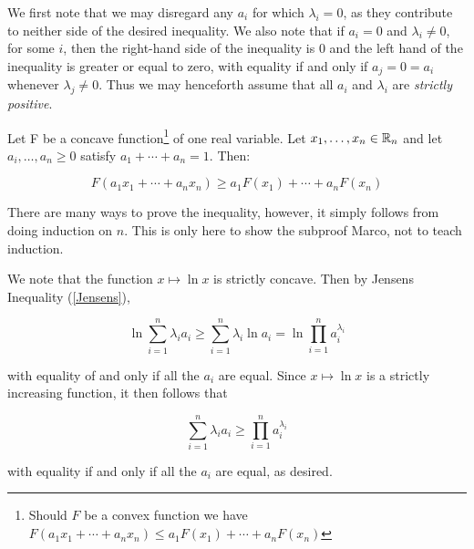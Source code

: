 \begin{solution}
	
	We first note that we may disregard any \(a_i\) for which \(\lambda_i=0\), as they contribute to neither side of the desired inequality. We also note that if \(a_i=0\) and \(\lambda_i\ne 0\), for some \(i\), then the right-hand side of the inequality is 0 and the left hand of the inequality is greater or equal to zero, with equality if and only if \(a_j=0=a_i\) whenever \(\lambda_j\ne 0\). Thus we may henceforth assume that all \(a_i\) and \(\lambda_i\) are \emph{strictly positive}.\\

	\begin{claim}\label{Jensens}
		Let F be a concave function\footnote{Should \(F\) be a convex function we have \(F(a_1x_1+\cdots+a_nx_n)\leq a_1F(x_1)+\cdots+a_nF(x_n)\)} of one real variable. Let \(x_1,\ldots,x_n\in\mathbb{R}_n\) and let \(a_i,\ldots,a_n\geq0\) satisfy \(a_1+\cdots+a_n=1\). Then:
		
		\[F(a_1x_1+\cdots+a_nx_n)\geq a_1F(x_1)+\cdots+a_nF(x_n)\]
	\end{claim}

	\begin{subproof}
		There are many ways to prove the inequality, however, it simply follows from doing induction on \(n\). This is only here to show the subproof Marco, not to teach induction.
	\end{subproof}

	We note that the function \(x\mapsto \ln x\) is strictly concave. Then by Jensens Inequality (\cref{Jensens}), 

	\[\ln\sum_{i=1}^n\lambda_ia_i\geq\sum_{i=1}^n\lambda_i\ln a_i=\ln\prod_{i=1}^na_i^{\lambda_i}\]

	with equality of and only if all the \(a_i\) are equal. Since \(x\mapsto \ln x\) is a strictly increasing function, it then follows that 

	\[\sum_{i=1}^n\lambda_ia_i\geq\prod_{i=1}^na_i^{\lambda_i}\]

	with equality if and only if all the \(a_i\) are equal, as desired.
	

\end{solution}